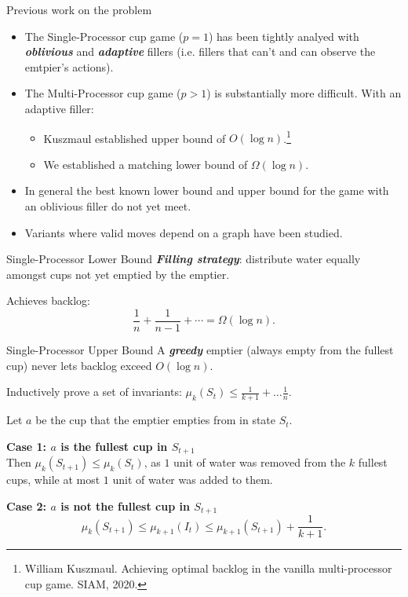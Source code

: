 \documentclass[xcolor=x11names, svgnames, rgb]{beamer}
\newcommand{\defn}[1]       {{\textit{\textbf{\boldmath #1}}}}
\begin{document}
\begin{frame}[t]{Previous work on the problem}
  \begin{itemize}
    \item The Single-Processor cup game ($p=1$) has been tightly analyed with
      \defn{oblivious} and \defn{adaptive} fillers (i.e. fillers that can't and
      can observe the emtpier's actions).
    \item The Multi-Processor cup game ($p>1$) is substantially more difficult. With an adaptive filler:
      \begin{itemize}
        \item Kuszmaul established upper bound of $O(\log n)$.\footnote{William Kuszmaul. Achieving optimal backlog in the vanilla multi-processor cup game. SIAM, 2020.}
        \item We established a matching lower bound of $\Omega(\log n)$.
      \end{itemize}
    \item In general the best known lower bound and upper bound for the game with an oblivious filler do not yet meet.
    \item Variants where valid moves depend on a graph have been studied.
  \end{itemize}
\end{frame}

\begin{frame}[t]{Single-Processor Lower Bound}
  \defn{Filling strategy}: distribute water equally amongst cups not yet emptied by the emptier.
  \vspace{1.5cm}

  Achieves backlog:
  $$\frac{1}{n} + \frac{1}{n-1} + \cdots = \Omega(\log n).$$
\end{frame}

\begin{frame}[t]{Single-Processor Upper Bound}
  A \defn{greedy} emptier (always empty from the fullest cup) never lets backlog exceed $O(\log n)$.
  \vspace{0.25cm}

  Inductively prove a set of invariants: $\mu_k(S_t) \le \frac{1}{k+1} + \ldots \frac{1}{n}$.

  Let $a$ be the cup that the emptier empties from in state $S_{t}$.

  \textbf{Case 1: $a$ is the fullest cup in $S_{t+1}$}\\
  Then $\mu_k(S_{t+1}) \le \mu_k(S_t)$, as $1$ unit of water was removed from
  the $k$ fullest cups, while at most $1$ unit of water was added to them.

  \textbf{Case 2: $a$ is not the fullest cup in $S_{t+1}$}
  $$\mu_k(S_{t+1}) \le \mu_{k+1}(I_t) \le \mu_{k+1}(S_{t+1}) + \frac{1}{k+1}.$$

\end{frame}
\end{document}
